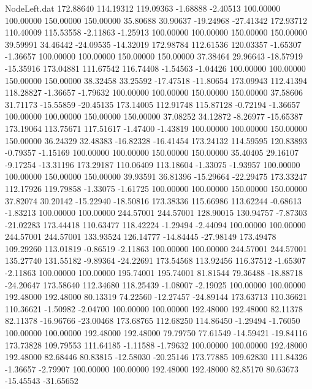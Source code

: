 \begin{filecontents}{NodeLeft.dat}
 172.88640  114.19312  119.09363    -1.68888   -2.40513  100.00000  100.00000  150.00000  150.00000   35.80688   30.90637  -19.24968  -27.41342
 172.93712  110.40009  115.53558    -2.11863   -1.25913  100.00000  100.00000  150.00000  150.00000   39.59991   34.46442  -24.09535  -14.32019
 172.98784  112.61536  120.03357    -1.65307   -1.36657  100.00000  100.00000  150.00000  150.00000   37.38464   29.96643  -18.57919  -15.35916
 173.04881  111.67542  116.74408    -1.54563   -1.04426  100.00000  100.00000  150.00000  150.00000   38.32458   33.25592  -17.47518  -11.80654
 173.09943  112.41394  118.28827    -1.36657   -1.79632  100.00000  100.00000  150.00000  150.00000   37.58606   31.71173  -15.55859  -20.45135
 173.14005  112.91748  115.87128    -0.72194   -1.36657  100.00000  100.00000  150.00000  150.00000   37.08252   34.12872   -8.26977  -15.65387
 173.19064  113.75671  117.51617    -1.47400   -1.43819  100.00000  100.00000  150.00000  150.00000   36.24329   32.48383  -16.82328  -16.41454
 173.24132  114.59595  120.83893    -0.79357   -1.15169  100.00000  100.00000  150.00000  150.00000   35.40405   29.16107   -9.17254  -13.31196
 173.29187  110.06409  113.18604    -1.33075   -1.93957  100.00000  100.00000  150.00000  150.00000   39.93591   36.81396  -15.29664  -22.29475
 173.33247  112.17926  119.79858    -1.33075   -1.61725  100.00000  100.00000  150.00000  150.00000   37.82074   30.20142  -15.22940  -18.50816
 173.38336  115.66986  113.62244    -0.68613   -1.83213  100.00000  100.00000  244.57001  244.57001  128.90015  130.94757   -7.87303  -21.02283
 173.44418  110.63477  118.42224    -1.29494   -2.44094  100.00000  100.00000  244.57001  244.57001  133.93524  126.14777  -14.84445  -27.98149
 173.49478  109.29260  113.01819    -0.86519   -2.11863  100.00000  100.00000  244.57001  244.57001  135.27740  131.55182   -9.89364  -24.22691
 173.54568  113.92456  116.37512    -1.65307   -2.11863  100.00000  100.00000  195.74001  195.74001   81.81544   79.36488  -18.88718  -24.20647
 173.58640  112.34680  118.25439    -1.08007   -2.19025  100.00000  100.00000  192.48000  192.48000   80.13319   74.22560  -12.27457  -24.89144
 173.63713  110.36621  110.36621    -1.50982   -2.04700  100.00000  100.00000  192.48000  192.48000   82.11378   82.11378  -16.96766  -23.00468
 173.68765  112.68250  114.86450    -1.29494   -1.76050  100.00000  100.00000  192.48000  192.48000   79.79750   77.61549  -14.59421  -19.84116
 173.73828  109.79553  111.64185    -1.11588   -1.79632  100.00000  100.00000  192.48000  192.48000   82.68446   80.83815  -12.58030  -20.25146
 173.77885  109.62830  111.84326    -1.36657   -2.79907  100.00000  100.00000  192.48000  192.48000   82.85170   80.63673  -15.45543  -31.65652

\end{filecontents}

